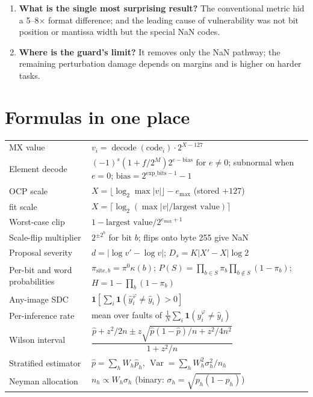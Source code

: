 \begin{enumerate}[leftmargin=0.7cm,itemsep=5pt]
\item \textbf{What is the single most surprising result?} The conventional metric hid a 5--8$\times$ format difference; and the leading cause of vulnerability was not bit position or mantissa width but the special NaN codes.
\item \textbf{Where is the guard's limit?} It removes only the NaN pathway; the remaining perturbation damage depends on margins and is higher on harder tasks.
\end{enumerate}

\section{Formulas in one place}
\renewcommand{\arraystretch}{1.3}
\begin{center}
\small
\begin{tabular}{@{}p{4.4cm}p{11cm}@{}}
\toprule
MX value & $v_i=\operatorname{decode}(\text{code}_i)\cdot2^{X-127}$ \\
Element decode & $(-1)^s(1+f/2^M)2^{e-\mathrm{bias}}$ for $e\ne0$; subnormal when $e=0$; $\mathrm{bias}=2^{\text{exp\_bits}-1}-1$ \\
OCP scale & $X=\lfloor\log_2\max|v|\rfloor-e_{\max}$ (stored $+127$) \\
fit scale & $X=\lceil\log_2(\max|v|/\text{largest value})\rceil$ \\
Worst-case clip & $1-\text{largest value}/2^{e_{\max}+1}$ \\
Scale-flip multiplier & $2^{\pm2^{b}}$ for bit $b$; flips onto byte 255 give NaN \\
Proposal severity & $d=|\log v'-\log v|$; $D_s=K|X'-X|\log2$ \\
Per-bit and word probabilities & $\pi_{\mathrm{site},b}=\pi^0\kappa(b)$; $P(S)=\prod_{b\in S}\pi_b\prod_{b\notin S}(1-\pi_b)$; $H=1-\prod_b(1-\pi_b)$ \\
Any-image SDC & $\mathbf1[\sum_i\mathbf1(\hat y_i^\varphi\ne\hat y_i)>0]$ \\
Per-inference rate & mean over faults of $\frac1N\sum_i\mathbf1(\hat y_i^\varphi\ne\hat y_i)$ \\
Wilson interval & $\dfrac{\hat p+z^2/2n\pm z\sqrt{\hat p(1-\hat p)/n+z^2/4n^2}}{1+z^2/n}$ \\
Stratified estimator & $\hat p=\sum_hW_h\hat p_h$, $\operatorname{Var}=\sum_hW_h^2\sigma_h^2/n_h$ \\
Neyman allocation & $n_h\propto W_h\sigma_h$ (binary: $\sigma_h=\sqrt{p_h(1-p_h)}$) \\

\end{tabular}
\end{center}
